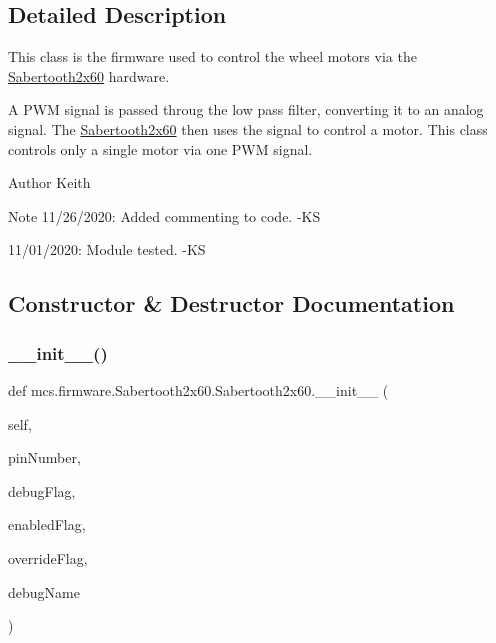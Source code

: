 \subsection{Detailed Description}
This class is the firmware used to control the wheel motors via the \hyperlink{classmcs_1_1firmware_1_1Sabertooth2x60_1_1Sabertooth2x60}{Sabertooth2x60} hardware. 

A P\+WM signal is passed throug the low pass filter, converting it to an analog signal. The \hyperlink{classmcs_1_1firmware_1_1Sabertooth2x60_1_1Sabertooth2x60}{Sabertooth2x60} then uses the signal to control a motor. This class controls only a single motor via one P\+WM signal. \begin{DoxyAuthor}{Author}
Keith 
\end{DoxyAuthor}
\begin{DoxyNote}{Note}
11/26/2020\+: Added commenting to code. -\/\+KS 

11/01/2020\+: Module tested. -\/\+KS 
\end{DoxyNote}


\subsection{Constructor \& Destructor Documentation}
\mbox{\label{classmcs_1_1firmware_1_1Sabertooth2x60_1_1Sabertooth2x60_a938a9afaddcc403820d6df881da6ed58}} 
\subsubsection{\texorpdfstring{\+\_\+\+\_\+init\+\_\+\+\_\+()}{\_\_init\_\_()}}
{\footnotesize\ttfamily def mcs.\+firmware.\+Sabertooth2x60.\+Sabertooth2x60.\+\_\+\+\_\+init\+\_\+\+\_\+ (\begin{DoxyParamCaption}\item[{}]{self,  }\item[{}]{pin\+Number,  }\item[{}]{debug\+Flag,  }\item[{}]{enabled\+Flag,  }\item[{}]{override\+Flag,  }\item[{}]{debug\+Name }\end{DoxyParamCaption})}



